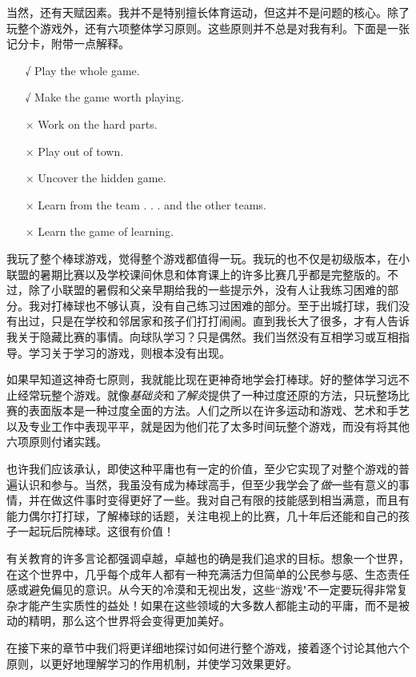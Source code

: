 当然，还有天赋因素。我并不是特别擅长体育运动，但这并不是问题的核心。除了玩整个游戏外，还有六项整体学习原则。这些原则并不总是对我有利。下面是一张记分卡，附带一点解释。
\begin{itemize}
\item[√] Play the whole game.
\item[√] Make the game worth playing.
\item[×] Work on the hard parts.
\item[×] Play out of town.
\item[×] Uncover the hidden game.
\item[×] Learn from the team . . . and the other teams. 
\item[×] Learn the game of learning.
\end{itemize}

我玩了整个棒球游戏，觉得整个游戏都值得一玩。我玩的也不仅是初级版本，在小联盟的暑期比赛以及学校课间休息和体育课上的许多比赛几乎都是完整版的。不过，除了小联盟的暑假和父亲早期给我的一些提示外，没有人让我练习困难的部分。我对打棒球也不够认真，没有自己练习过困难的部分。至于出城打球，我们没有出过，只是在学校和邻居家和孩子们打打闹闹。直到我长大了很多，才有人告诉我关于隐藏比赛的事情。向球队学习？只是偶然。我们当然没有互相学习或互相指导。学习关于学习的游戏，则根本没有出现。

如果早知道这神奇七原则，我就能比现在更神奇地学会打棒球。好的整体学习远不止经常玩整个游戏。就像\textit{基础炎}和\textit{了解炎}提供了一种过度还原的方法，只玩整场比赛的表面版本是一种过度全面的方法。人们之所以在许多运动和游戏、艺术和手艺以及专业工作中表现平平，就是因为他们花了太多时间玩整个游戏，而没有将其他六项原则付诸实践。

也许我们应该承认，即使这种平庸也有一定的价值，至少它实现了对整个游戏的普遍认识和参与。当然，我虽没有成为棒球高手，但至少我学会了\textit{做}一些有意义的事情，并在做这件事时变得更好了一些。我对自己有限的技能感到相当满意，而且有能力偶尔打打球，了解棒球的话题，关注电视上的比赛，几十年后还能和自己的孩子一起玩后院棒球。这很有价值！

有关教育的许多言论都强调卓越，卓越也的确是我们追求的目标。想象一个世界，在这个世界中，几乎每个成年人都有一种充满活力但简单的公民参与感、生态责任感或避免偏见的意识。从今天的冷漠和无视出发，这些``游戏"不一定要玩得非常复杂才能产生实质性的益处！如果在这些领域的大多数人都能主动的平庸，而不是被动的精明，那么这个世界将会变得更加美好。

在接下来的章节中我们将更详细地探讨如何进行整个游戏，接着逐个讨论其他六个原则，以更好地理解学习的作用机制，并使学习效果更好。